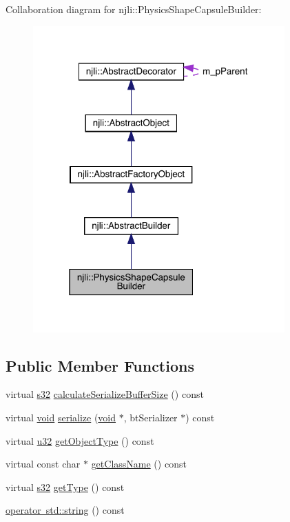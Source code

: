 Collaboration diagram for njli\+:\+:Physics\+Shape\+Capsule\+Builder\+:\nopagebreak
\begin{figure}[H]
\begin{center}
\leavevmode
\includegraphics[width=274pt]{classnjli_1_1_physics_shape_capsule_builder__coll__graph}
\end{center}
\end{figure}
\subsection*{Public Member Functions}
\begin{DoxyCompactItemize}
\item 
virtual \mbox{\hyperlink{_util_8h_aa62c75d314a0d1f37f79c4b73b2292e2}{s32}} \mbox{\hyperlink{classnjli_1_1_physics_shape_capsule_builder_a2478bdaf8359646a09b54d80c330aa8a}{calculate\+Serialize\+Buffer\+Size}} () const
\item 
virtual \mbox{\hyperlink{_thread_8h_af1e856da2e658414cb2456cb6f7ebc66}{void}} \mbox{\hyperlink{classnjli_1_1_physics_shape_capsule_builder_ac3f3335354278473758cab0428df5216}{serialize}} (\mbox{\hyperlink{_thread_8h_af1e856da2e658414cb2456cb6f7ebc66}{void}} $\ast$, bt\+Serializer $\ast$) const
\item 
virtual \mbox{\hyperlink{_util_8h_a10e94b422ef0c20dcdec20d31a1f5049}{u32}} \mbox{\hyperlink{classnjli_1_1_physics_shape_capsule_builder_a449979329f6b4b4093396ab819076c72}{get\+Object\+Type}} () const
\item 
virtual const char $\ast$ \mbox{\hyperlink{classnjli_1_1_physics_shape_capsule_builder_ad3c2c7ec2142d57fff20665c52213461}{get\+Class\+Name}} () const
\item 
virtual \mbox{\hyperlink{_util_8h_aa62c75d314a0d1f37f79c4b73b2292e2}{s32}} \mbox{\hyperlink{classnjli_1_1_physics_shape_capsule_builder_a7fd6bd989de9f3b930b7af5816dddb3b}{get\+Type}} () const
\item 
\mbox{\hyperlink{classnjli_1_1_physics_shape_capsule_builder_a871383ee2ac35cb2c4fc762fa6cb8310}{operator std\+::string}} () const
\end{DoxyCompactItemize}
